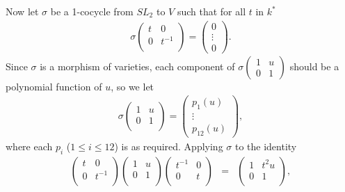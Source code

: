 Now let $\sigma$ be a 1-cocycle from $SL_2$ to $V$ such that for all $t$ in $k^*$
\begin{eqnarray*}
\sigma\left(\begin{matrix} %
      t & 0 \\
      0 & t^{-1} \\
   \end{matrix}\right) = \left( \begin{matrix} 0 \\ \vdots \\ 0 \end{matrix}\right).
\end{eqnarray*}
Since $\sigma$ is a morphism of varieties, each component of $\sigma\left(\begin{matrix} 1 & u \\ 0 & 1\end{matrix}\right)$ should be a polynomial function of $u$, so we let
\begin{eqnarray*}
\sigma \left( \begin{matrix} %
      1 & u \\
      0 & 1 \\
   \end{matrix}\right) = \left( \begin{matrix} p_1(u) \\ \vdots \\ p_{12}(u) \end{matrix} \right),
\end{eqnarray*}
where each $p_i$ ($1\leq i \leq 12$) is as required. Applying $\sigma$ to the identity
\begin{eqnarray*}
  \left( \begin{matrix}
      t & 0 \\
      0 & t^{-1} \\
   \end{matrix}\right)
   \left(\begin{matrix}
      1 & u \\
      0 & 1 \\
   \end{matrix}\right)
   \left(\begin{matrix}
      t^{-1} & 0 \\
      0 & t \\
   \end{matrix}\right) &=&
\left(   \begin{matrix}
      1 & t^2u \\
      0 & 1 \\
   \end{matrix}\right),
 \end{eqnarray*}
